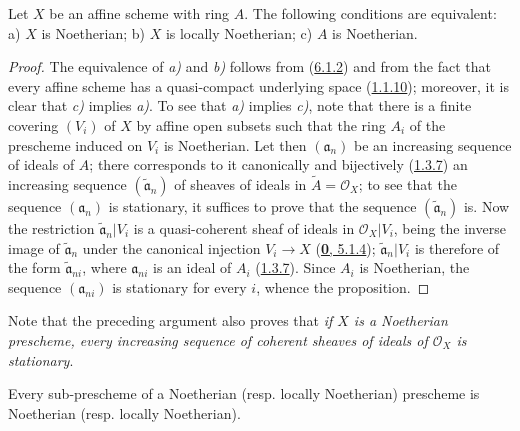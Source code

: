 \begin{proposition}[6.1.3]
\label{I.6.1.3}
Let $X$ be an affine scheme with ring $A$. The following conditions are
equivalent: \textup{a)} $X$ is Noetherian; \textup{b)} $X$ is locally Noetherian;
\textup{c)} $A$ is Noetherian.
\end{proposition}

\begin{proof}
The equivalence of \emph{a)} and \emph{b)} follows from (\hyperref[I.6.1.2]{6.1.2}) and
from the fact that every affine scheme has a quasi-compact underlying space
(\hyperref[I.1.1.10]{1.1.10}); moreover, it is clear that \emph{c)} implies \emph{a)}.
To see that \emph{a)} implies \emph{c)}, note that there is a finite covering
$(V_i)$ of $X$ by affine open subsets such that the ring $A_i$ of the
prescheme induced on $V_i$ is Noetherian. Let then $(\mathfrak{a}_n)$ be an
increasing sequence of ideals of $A$; there corresponds to it canonically and
bijectively (\hyperref[I.1.3.7]{1.3.7}) an increasing sequence
$(\widetilde{\mathfrak{a}}_n)$ of sheaves of ideals in
$\widetilde{A}=\mathscr{O}_X$; to see that the sequence
$(\mathfrak{a}_n)$ is stationary, it suffices to prove that the sequence
$(\widetilde{\mathfrak{a}}_n)$ is. Now the restriction
$\widetilde{\mathfrak{a}}_n|V_i$ is a quasi-coherent sheaf of ideals in
$\mathscr{O}_X|V_i$, being the inverse image of
$\widetilde{\mathfrak{a}}_n$ under the canonical injection $V_i\to X$
(\hyperref[0.5.1.4]{\textbf{0}, 5.1.4}); $\widetilde{\mathfrak{a}}_n|V_i$ is
therefore of the form $\widetilde{\mathfrak{a}}_{ni}$, where $\mathfrak{a}_{ni}$
is an ideal of $A_i$ (\hyperref[I.1.3.7]{1.3.7}). Since $A_i$ is
Noetherian, the sequence $(\mathfrak{a}_{ni})$ is stationary for every $i$,
whence the proposition.
\end{proof}

Note that the preceding argument also proves that \emph{if $X$ is a
Noetherian prescheme, every increasing sequence of coherent sheaves of ideals
of $\mathscr{O}_X$ is stationary}.

\begin{proposition}[6.1.4]
\label{I.6.1.4}
Every sub-prescheme of a Noetherian \textup{(resp.} locally Noetherian) prescheme
is Noetherian \textup{(resp.} locally Noetherian).
\end{proposition}

